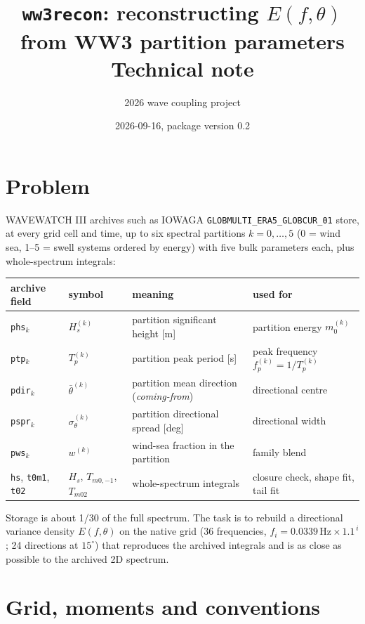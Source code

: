 \documentclass[11pt,a4paper]{article}
\title{\texttt{ww3recon}: reconstructing $E(f,\theta)$ from WW3 partition parameters\\[4pt]
\large Technical note}
\author{2026 wave coupling project}
\date{2026-09-16, package version 0.2}
\newcommand{\Hs}{H_s}
\begin{document}
\maketitle

\section{Problem}

WAVEWATCH III archives such as IOWAGA \texttt{GLOBMULTI\_ERA5\_GLOBCUR\_01} store, at every grid
cell and time, up to six spectral partitions $k=0,\dots,5$ (0 = wind sea, 1--5 = swell systems
ordered by energy) with five bulk parameters each, plus whole-spectrum integrals:
\begin{center}
\begin{tabular}{llll}
\toprule
archive field & symbol & meaning & used for\\
\midrule
\texttt{phs}$_k$ & $\Hs^{(k)}$ & partition significant height [m] & partition energy $m_0^{(k)}$\\
\texttt{ptp}$_k$ & $T_p^{(k)}$ & partition peak period [s] & peak frequency $f_p^{(k)} = 1/T_p^{(k)}$\\
\texttt{pdir}$_k$ & $\bar\theta^{(k)}$ & partition mean direction (\emph{coming-from}) & directional centre\\
\texttt{pspr}$_k$ & $\sigma_\theta^{(k)}$ & partition directional spread [deg] & directional width\\
\texttt{pws}$_k$ & $w^{(k)}$ & wind-sea fraction in the partition & family blend\\
\texttt{hs}, \texttt{t0m1}, \texttt{t02} & $\Hs$, $T_{m0,-1}$, $T_{m02}$ & whole-spectrum integrals & closure check, shape fit, tail fit\\
\bottomrule
\end{tabular}
\end{center}
Storage is about 1/30 of the full spectrum. The task is to rebuild a directional variance density
$E(f,\theta)$ on the native grid (36 frequencies, $f_i = 0.0339\,\mathrm{Hz}\times1.1^{\,i}$; 24 directions at
$15^\circ$) that reproduces the archived integrals and is as close as possible to the archived 2D spectrum.

\section{Grid, moments and conventions}
\end{document}
